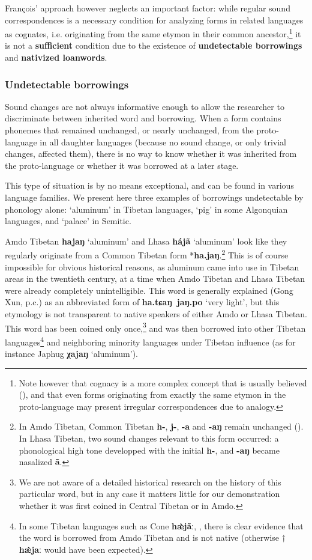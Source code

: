 \documentclass[svgnames,12pt]{scrartcl}
\newcommand{\ipa}[1]{\textbf{{\phon\mbox{#1}}}}
\begin{document}
{{François' approach however neglects an important factor: while regular sound correspondences is a necessary condition for analyzing forms in related languages as cognates, i.e. originating from the same etymon in their common ancestor,\footnote{Note however that cognacy is a more complex concept that is usually believed (\citealt{list16cognacy}), and that even forms originating from exactly the same etymon in the proto-language may present irregular correspondences due to analogy. } it is not a \textbf{sufficient} condition due to the existence of \textbf{undetectable borrowings} and \textbf{nativized loanwords}.  



\subsubsection{Undetectable borrowings}
Sound changes are not always informative enough to allow the researcher to discriminate between inherited word and borrowing. When a form contains phonemes that remained unchanged, or nearly unchanged, from the proto-language in all daughter languages (because no sound change, or only trivial changes, affected them), there is no way to know whether it was inherited from the proto-language or whether it was borrowed at a later stage. 

This type of situation is by no means exceptional, and can be found in various language families. We present here three examples of borrowings undetectable by phonology alone: `aluminum' in Tibetan languages, `pig' in some Algonquian languages, and `palace' in Semitic. 

Amdo Tibetan \ipa{hajaŋ} `aluminum' and Lhasa \ipa{hájã} `aluminum' look like they regularly originate from a Common Tibetan form *\ipa{ha.jaŋ}.\footnote{In Amdo Tibetan, Common Tibetan \ipa{h-}, \ipa{j-}, \ipa{-a} and \ipa{-aŋ} remain unchanged (\citealt{gong16amdo}). In Lhasa Tibetan, two sound changes relevant to this form occurred: a phonological high tone developped with the initial \ipa{h-}, and \ipa{-aŋ} became nasalized \ipa{ã}.} This is of course impossible for obvious historical reasons, as aluminum came into use in Tibetan areas in the twentieth century, at a time when Amdo Tibetan and Lhasa Tibetan were already completely unintelligible. This word is generally explained (Gong Xun, p.c.) as an abbreviated form of \ipa{ha.tɕaŋ jaŋ.po} `very light', but this etymology is not transparent to native speakers of either Amdo or Lhasa Tibetan. This word has been coined only once,\footnote{We are not aware of a detailed historical research on the history of this particular word, but in any case it matters little for our demonstration whether it was first coined in Central Tibetan or in Amdo.} and was then borrowed into other Tibetan languages\footnote{In some Tibetan languages such as Cone \ipa{hæ̀jãː}, \citet[306]{jacques14cone}, there is clear evidence that the word is borrowed from Amdo Tibetan and is not native (otherwise $\dagger$\ipa{hæ̀jaː} would have been expected). } and neighboring minority languages under Tibetan influence (as for instance Japhug \ipa{χajaŋ} `aluminum').

}}
\end{document}
